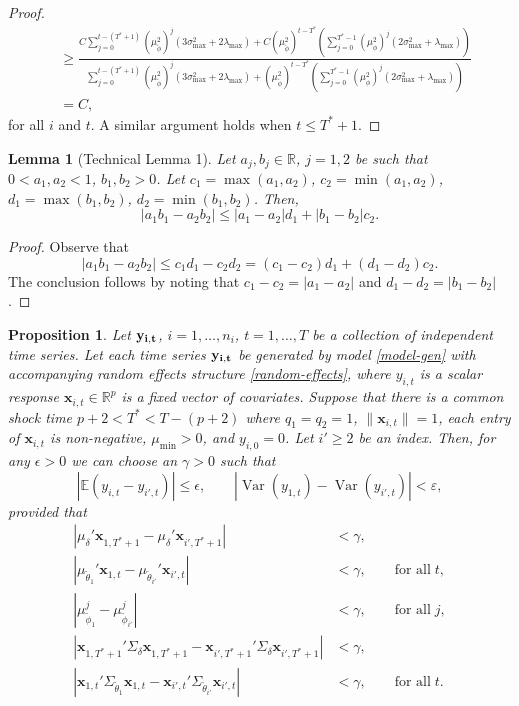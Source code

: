 \documentclass[11pt]{article}
\newcommand{\R}{\mathbb{R}}
\newcommand{\x}{\textbf{x}}
\def\E{\mathbb{E}} %
\DeclareMathOperator{\Var}{Var} %
\newtheorem{lem}{Lemma}
\newtheorem{prop}{Proposition}
\theoremstyle{definition}
\begin{document}
\begin{proof}
\begin{align*}
  &\geq \frac{C\sum_{j=0}^{t - (T^*+1)} (\mu_{\tilde\phi}^2)^j\left(3\sigma^2_{\max} + 2\lambda_{\max}\right) + C(\mu_{\tilde\phi}^2)^{t - T^*}\left(\sum_{j=0}^{T^*-1}\left(\mu_{\phi}^2\right)^{j}(2\sigma^2_{\max} + \lambda_{\max})\right)}{\sum_{j=0}^{t - (T^*+1)} (\mu_{\tilde\phi}^2)^j\left(3\sigma^2_{\max} + 2\lambda_{\max}\right) + (\mu_{\tilde\phi}^2)^{t - T^*}\left(\sum_{j=0}^{T^*-1}\left(\mu_{\phi}^2\right)^{j}(2\sigma^2_{\max} + \lambda_{\max})\right)} \\
  &= C,
\end{align*}
for all $i$ and $t$. A similar argument holds when $t \leq T^* + 1$.
\end{proof}


\begin{lem}[Technical Lemma 1] \label{lem:absdiff}
Let $a_j, b_j \in \R$, $j = 1,2$ be such that $0 < a_1,a_2 < 1$, $b_1,b_2 > 0$. Let $c_1 = \max(a_1,a_2)$, $c_2 = \min(a_1,a_2)$, $d_1 = \max(b_1,b_2)$, $d_2 = \min(b_1,b_2)$. Then, 
$$
  |a_1b_1 - a_2b_2| \leq |a_1 - a_2|d_1 + |b_1 - b_2|c_2.
$$
\end{lem}

\begin{proof}
Observe that 
$$
  |a_1b_1 - a_2b_2| \leq c_1d_1 - c_2d_2 = (c_1 - c_2)d_1 + (d_1 - d_2)c_2. 
$$
The conclusion follows by noting that $c_1 - c_2 = |a_1 - a_2|$ and $d_1 - d_2 = |b_1 - b_2|$.
\end{proof}


\begin{prop}
	Let $\bf{y}_{i,t}$, $i = 1,\ldots,n_i$, $t = 1,\ldots, T$ be a collection of independent time series. Let each time series $\bf{y}_{i,t}$ be generated by model \eqref{model-gen} with accompanying random effects structure \eqref{random-effects}, where $y_{i,t}$ is a scalar response $\x_{i,t} \in \R^p$ is a fixed vector of covariates. Suppose that there is a common shock time $p + 2 < T^* < T - (p+2)$ where $q_1 = q_2 = 1$, $\|\x_{i,t}\| = 1$, each entry of $\x_{i,t}$ is non-negative, $\mu_{\min} > 0$, and $y_{i,0} = 0$. Let $i' \geq 2$ be an index. Then, for any $\epsilon > 0$ we can choose an $\gamma > 0$ such that 
	$$
	  \left\vert\E(y_{i,t} - y_{i',t})\right\vert \leq \epsilon, \qquad |\Var(y_{1,t}) - \Var(y_{i',t})| < \varepsilon,
	$$
	provided that 
	\begin{align*}
  |\mu_\delta'\x_{1,T^*+1} - \mu_\delta'\x_{i',T^*+1}| &< \gamma, \\
  \left\vert\mu_{\tilde\theta_{1}}'\x_{1,t} - \mu_{\tilde\theta_{i'}}'\x_{i',t}\right\vert &< \gamma, \qquad \text{for all} \; t, \\
  |\mu_{\tilde\phi_1}^j - \mu_{\tilde\phi_{i'}}^j| &< \gamma, \qquad \text{for all} \; j, \\
  |\x_{1,T^*+1}'\Sigma_\delta\x_{1,T^*+1} - \x_{i',T^*+1}'\Sigma_\delta\x_{i',T^*+1}| &< \gamma, \\
  |\x_{1,t}'\Sigma_{\tilde\theta_{1}}\x_{1,t} - \x_{i',t}'\Sigma_{\tilde\theta_{i'}}\x_{i',t}| &< \gamma, \qquad \text{for all} \; t.
	\end{align*}
\end{prop}
\end{document}
